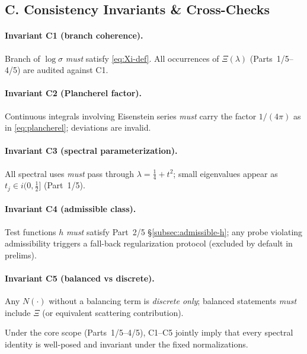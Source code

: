 
\subsection*{C. Consistency Invariants \& Cross-Checks}
\label{subsec:consistency}

\paragraph{Invariant C1 (branch coherence).}
Branch of $\log \sigma$ \emph{must} satisfy \eqref{eq:Xi-def}. All occurrences of $\Xi(\lambda)$ (Parts~1/5–4/5) are audited against C1.

\paragraph{Invariant C2 (Plancherel factor).}
Continuous integrals involving Eisenstein series \emph{must} carry the factor $1/(4\pi)$ as in \eqref{eq:plancherel}; deviations are invalid.

\paragraph{Invariant C3 (spectral parameterization).}
All spectral uses \emph{must} pass through $\lambda=\frac14+t^2$; small eigenvalues appear as $t_j\in i(0,\frac12]$ (Part~1/5).

\paragraph{Invariant C4 (admissible class).}
Test functions $h$ \emph{must} satisfy Part~2/5 \S\ref{subsec:admissible-h}; any probe violating admissibility triggers a fall-back regularization protocol (excluded by default in prelims).

\paragraph{Invariant C5 (balanced vs discrete).}
Any $N(\cdot)$ without a balancing term is \emph{discrete only}; balanced statements \emph{must} include $\Xi$ (or equivalent scattering contribution).

\begin{lemma}
\label{lem:cross-check}
Under the core scope (Parts~1/5–4/5), C1–C5 jointly imply that every spectral identity is well-posed and invariant under the fixed normalizations.
\end{lemma}

